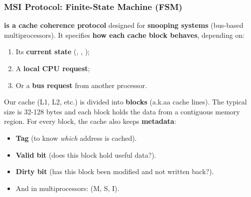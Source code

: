 \subsubsection{MSI Protocol: Finite-State Machine (FSM)}

 \textbf{is a cache coherence protocol} designed for \textbf{snooping systems} (bus-based multiprocessors). It specifies \textbf{how each cache block behaves}, depending on:
\begin{enumerate}
    \item Its \textbf{current state} (, , );
    \item A \textbf{local CPU request};
    \item Or a \textbf{bus request} from another processor.
\end{enumerate}

\begin{remarkbox}
    Our cache (L1, L2, etc.) is divided into \textbf{blocks} (a.k.aa cache lines). The typical size is 32-128 bytes and each block holds the data from a contiguous memory region. For every block, the cache also keeps \textbf{metadata}:
    \begin{itemize}
        \item \textbf{Tag} (to know \emph{which} address is cached).
        \item \textbf{Valid bit} (does this block hold useful data?).
        \item \textbf{Dirty bit} (has this block been modified and not written back?).
        \item And in multiprocessors:  (M, S, I).
    \end{itemize}
\end{remarkbox}

